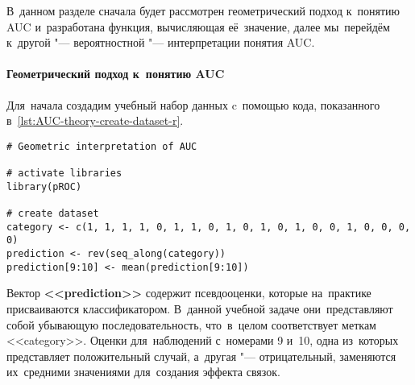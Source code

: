 \documentclass[]{scrreprt}
\begin{document}
В~данном разделе сначала будет рассмотрен геометрический подход к~понятию AUC и~разработана функция, вычисляющая её~значение, далее мы~перейдём к~другой "--- вероятностной "--- интерпретации понятия AUC.

\paragraph{Геометрический подход к~понятию AUC}
Для~начала создадим учебный набор данных c~помощью кода, показанного в~\ref{lst:AUC-theory-create-dataset-r}.
%
\begin{lstlisting}[float, caption = Создание тестового набора данных, firstnumber=1, label= lst:AUC-theory-create-dataset-r]
# Geometric interpretation of AUC

# activate libraries
library(pROC)

# create dataset
category <- c(1, 1, 1, 1, 0, 1, 1, 0, 1, 0, 1, 0, 1, 0, 0, 1, 0, 0, 0, 0)
prediction <- rev(seq_along(category))
prediction[9:10] <- mean(prediction[9:10])
\end{lstlisting}
%
Вектор \textbf{<<\foreignlanguage{english}{prediction}>>} содержит псевдооценки, которые на~практике присваиваются классификатором. В~данной учебной задаче они~представляют собой убывающую последовательность, что~в~целом соответствует меткам <<\foreignlanguage{english}{category}>>. Оценки для~наблюдений с~номерами 9 и~10, одна из~которых представляет положительный случай, а~другая "--- отрицательный, заменяются их~средними значениями для~создания эффекта связок.
\end{document}
